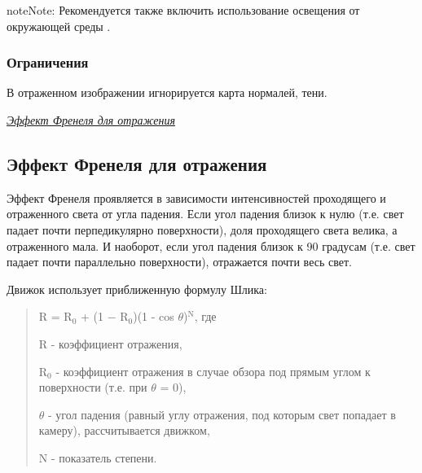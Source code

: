 \documentclass[a4paper,12pt,oneside]{sphinxmanual}
\begin{document}
\begin{notice}{note}{Note:}
Рекомендуется также включить использование освещения от окружающей среды .
\end{notice}


\subsubsection{Ограничения}
\label{materials:id10}
В отраженном изображении игнорируется карта нормалей, тени.




{\hyperref[materials:fresnel]{\emph{Эффект Френеля для отражения}}}




\subsection{Эффект Френеля для отражения}
\label{materials:id11}\label{materials:fresnel}\label{materials:index-8}
Эффект Френеля проявляется в зависимости интенсивностей проходящего и отраженного света от угла падения. Если угол падения близок к нулю (т.е. свет падает почти перпедикулярно поверхности), доля проходящего света велика, а отраженного мала. И наоборот, если угол падения близок к 90 градусам (т.е. свет падает почти параллельно поверхности), отражается почти весь свет.

Движок использует приближенную формулу Шлика:
\begin{quote}

R = R$_{\text{0}}$ + (1 − R$_{\text{0}}$)(1 - cos \(\theta\))$^{\text{N}}$, где

R - коэффициент отражения,

R$_{\text{0}}$ - коэффициент отражения в случае обзора под прямым углом к поверхности (т.е. при \(\theta\) = 0),

\(\theta\) - угол падения (равный углу отражения, под которым свет попадает в камеру), рассчитывается движком,

N - показатель степени.
\end{quote}
\end{document}
